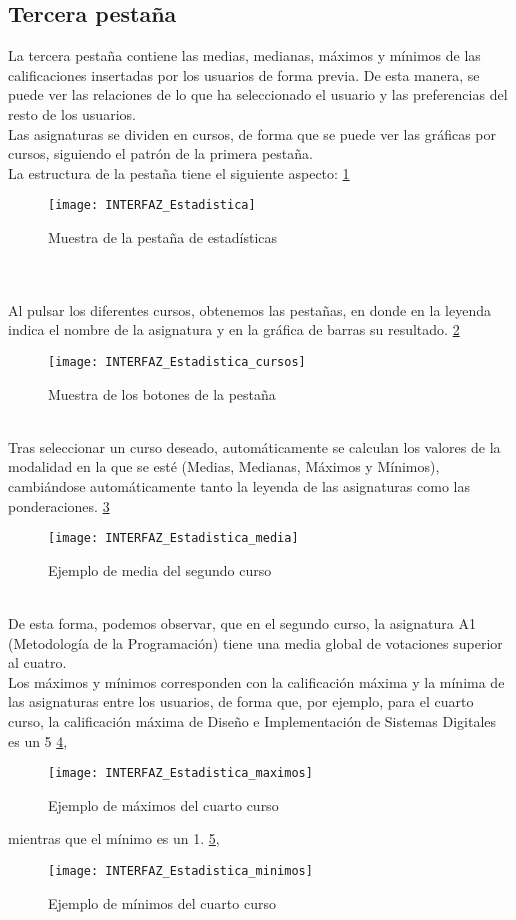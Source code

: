 \subsection{Tercera pestaña}
La tercera pestaña contiene las medias, medianas, máximos y mínimos de las calificaciones insertadas por los usuarios de forma previa. De esta manera, se puede ver las relaciones de lo que ha seleccionado el usuario y las preferencias del resto de los usuarios. 
\\Las asignaturas se dividen en cursos, de forma que se puede ver las gráficas por cursos, siguiendo el patrón de la primera pestaña. 
\\La estructura de la pestaña tiene el siguiente aspecto: \ref{fig:E.2.13} 
\begin{figure}[h]
\centering
\texttt{[image: INTERFAZ\_Estadistica]}
\caption{Muestra de la pestaña de estadísticas}
\label{fig:E.2.13}
\end{figure}
\\\\Al pulsar los diferentes cursos, obtenemos las pestañas, en donde en la leyenda indica el nombre de la asignatura y en la gráfica de barras su resultado. \ref{fig:E.2.14} 
\begin{figure}[h]
\centering
\texttt{[image: INTERFAZ\_Estadistica\_cursos]}
\caption{Muestra de los botones de la pestaña}
\label{fig:E.2.14}
\end{figure}
\\Tras seleccionar un curso deseado, automáticamente se calculan los valores de la modalidad en la que se esté (Medias, Medianas, Máximos y Mínimos), cambiándose automáticamente tanto la leyenda de las asignaturas como las ponderaciones. \ref{fig:E.2.15} 
\begin{figure}[h]
\centering
\texttt{[image: INTERFAZ\_Estadistica\_media]}
\caption{Ejemplo de media del segundo curso}
\label{fig:E.2.15}
\end{figure}
\\ De esta forma, podemos observar, que en el segundo curso, la asignatura A1 (Metodología de la Programación) tiene una media global de votaciones superior al cuatro. 
\\ Los máximos y mínimos corresponden con la calificación máxima y la mínima de las asignaturas entre los usuarios, de forma que, por ejemplo, para el cuarto curso, la calificación máxima de Diseño e Implementación de Sistemas Digitales es un 5 \ref{fig:E.2.16}, 
\begin{figure}[h]
\centering
\texttt{[image: INTERFAZ\_Estadistica\_maximos]}
\caption{Ejemplo de máximos del cuarto curso}
\label{fig:E.2.16}
\end{figure}
mientras que el mínimo es un 1. \ref{fig:E.2.17}, 
\begin{figure}[h]
\centering
\texttt{[image: INTERFAZ\_Estadistica\_minimos]}
\caption{Ejemplo de mínimos del cuarto curso}
\label{fig:E.2.17}
\end{figure}






